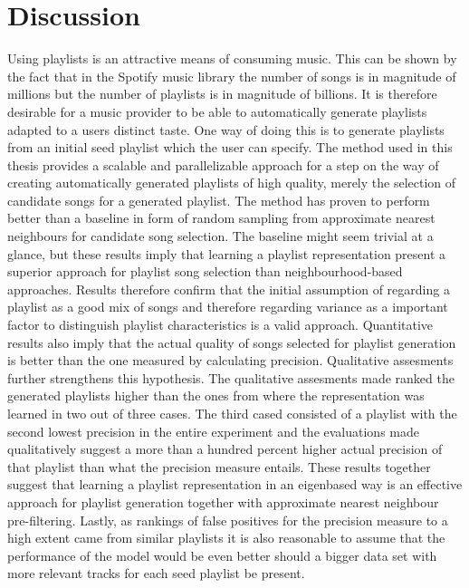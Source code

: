 \documentclass[a4paper,11pt]{kth-mag}
\begin{document}
\section{Discussion}
Using playlists is an attractive means of consuming music. This can be shown by the fact that in the Spotify music library the number of songs is in magnitude of millions but the number of playlists is in magnitude of billions. It is therefore desirable for a music provider to be able to automatically generate playlists adapted to a users distinct taste. One way of doing this is to generate playlists from an initial seed playlist which the user can specify.
 The method used in this thesis provides a scalable and parallelizable approach for a step on the way of creating automatically generated playlists of high quality, merely the selection of candidate songs for a generated playlist. The method has proven to perform better than a baseline in form of random sampling from approximate nearest neighbours for candidate song selection. The baseline might seem trivial at a glance, but these results imply that learning a playlist representation present a superior approach for playlist song selection than neighbourhood-based approaches. Results therefore confirm that the initial assumption of regarding a playlist as a good mix of songs and therefore regarding variance as a important factor to distinguish playlist characteristics is a valid approach.
 Quantitative results also imply that the actual quality of songs selected for playlist generation is better than the one measured by calculating precision. Qualitative assesments further strengthens this hypothesis. The qualitative assesments made ranked the generated playlists higher than the ones from where the representation was learned in two out of three cases. The third cased consisted of a playlist with the second lowest precision in the entire experiment and the evaluations made qualitatively suggest a more than a hundred percent higher actual precision of that playlist than what the precision measure entails. These results together suggest that learning a playlist representation in an eigenbased way is an effective approach for playlist generation together with approximate nearest neighbour pre-filtering. Lastly, as rankings of false positives for the precision measure to a high extent came from similar playlists it is also reasonable to assume that the performance of the model would be even better should a bigger data set with more relevant tracks for each seed playlist be present. 
\end{document}
